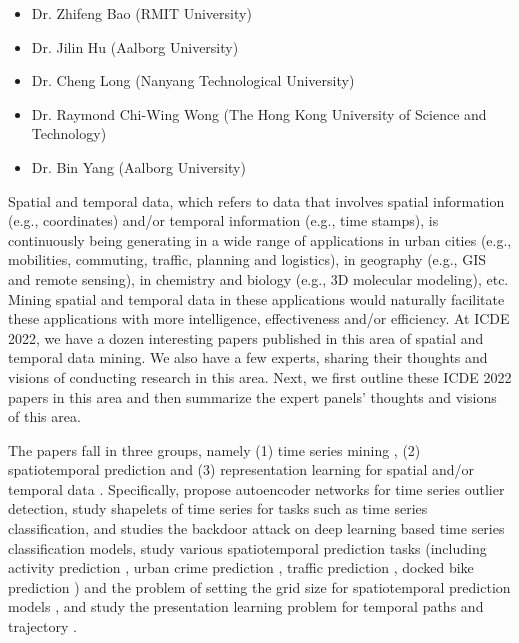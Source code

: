 \documentclass[11pt,dvipdfm]{article}
\begin{document}
\begin{itemize}
    \item Dr. Zhifeng Bao (RMIT University)
    \item Dr. Jilin Hu (Aalborg University)
    \item Dr. Cheng Long (Nanyang Technological University)
    \item Dr. Raymond Chi-Wing Wong (The Hong Kong University of Science and Technology)
    \item Dr. Bin Yang (Aalborg University)
\end{itemize}

Spatial and temporal data, which refers to data that involves spatial information (e.g., coordinates) and/or temporal information (e.g., time stamps), is continuously being generating in a wide range of applications in urban cities (e.g., mobilities, commuting, traffic, planning and logistics), in geography (e.g., GIS and remote sensing), in chemistry and biology (e.g., 3D molecular modeling), etc. Mining spatial and temporal data in these applications would naturally facilitate these applications with more intelligence, effectiveness and/or efficiency. At ICDE 2022, we have a dozen interesting papers published in this area of spatial and temporal data mining. We also have a few experts, sharing their thoughts and visions of conducting research in this area. Next, we first outline these ICDE 2022 papers in this area and then summarize the expert panels' thoughts and visions of this area.

The papers fall in three groups, namely (1) time series mining \cite{STM1,STM2,STM3,STM4,STM5}, (2) spatiotemporal prediction \cite{STM6,STM7,STM8,STM9,STM10} and (3) representation learning for spatial and/or temporal data \cite{STM11,STM12}. Specifically, \cite{STM1,STM2} propose autoencoder networks for time series outlier detection, \cite{STM3,STM4} study shapelets of time series for tasks such as time series classification, and \cite{STM5} studies the backdoor attack on deep learning based time series classification models, \cite{STM6,STM7,STM8,STM9,STM10} study various spatiotemporal prediction tasks (including activity prediction \cite{STM6}, urban crime prediction \cite{STM7}, traffic prediction \cite{STM8}, docked bike prediction \cite{STM9}) and the problem of setting the grid size for spatiotemporal prediction models \cite{STM10}, and \cite{STM11,STM12} study the presentation learning problem for temporal paths \cite{STM11} and trajectory \cite{STM12}. 
\end{document}
